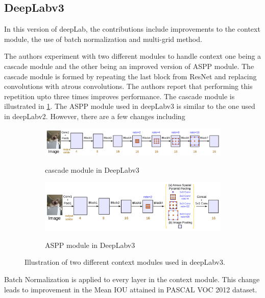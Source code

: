 \subsection{DeepLabv3}
In this version of deepLab, the contributions include improvements to the context module, the use of batch normalization and multi-grid method.

The authors experiment with two different modules to handle context one being a cascade module and the other being an improved version of ASPP module. The cascade module is formed by repeating the last block from ResNet and replacing convolutions with atrous convolutions. The authors report that performing this repetition upto three times improves performance. 	The cascade module is illustrated in \ref{Fig:contextmodulea}. The ASPP module used in deepLabv3 is similar to the one used in deepLabv2. However, there are a few changes including

	\begin{figure}[!htb]
		\begin{subfigure}{1\textwidth}
			\centering
			\includegraphics[width=1\linewidth]{images/cascade_module}
			\label{Fig:contextmodulea}
			\caption{cascade module in DeepLabv3}
		\end{subfigure}
		\begin{subfigure}{1\textwidth}
			\centering
			\includegraphics[width=1\linewidth]{images/aspp_module}
			\label{Fig:contextmoduleb}
			\caption{ASPP module in DeepLabv3}
		\end{subfigure}
		\caption{Illustration of two different context modules used in deepLabv3.}
		\label{Fig:contextmodule}
	\end{figure}

Batch Normalization is applied to every layer in the context module. This change leads to improvement in the Mean IOU attained in PASCAL VOC 2012 dataset. 

